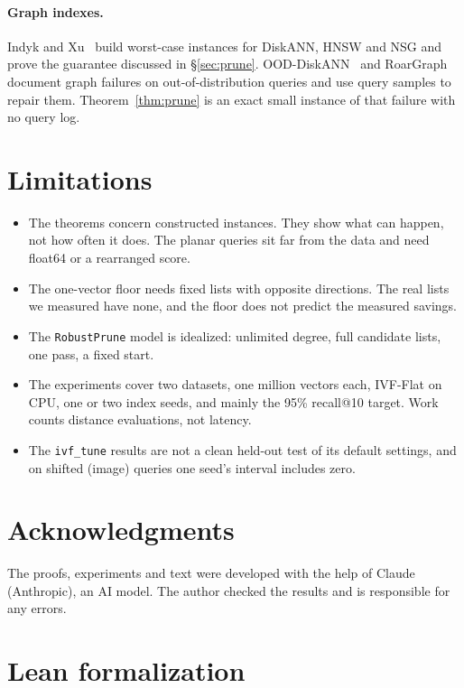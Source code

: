 \documentclass[11pt]{article}
\theoremstyle{definition}
\theoremstyle{remark}
\begin{document}
\paragraph{Graph indexes.} Indyk and Xu~\cite{indyk2023} build worst-case instances for DiskANN, HNSW and NSG and prove the guarantee discussed in \S\ref{sec:prune}. OOD-DiskANN~\cite{jaiswal2022ood} and RoarGraph~\cite{chen2024roargraph} document graph failures on out-of-distribution queries and use query samples to repair them. Theorem~\ref{thm:prune} is an exact small instance of that failure with no query log.

\section{Limitations}\label{sec:limits}

\begin{itemize}
\item The theorems concern constructed instances. They show what can happen, not how often it does. The planar queries sit far from the data and need float64 or a rearranged score.
\item The one-vector floor needs fixed lists with opposite directions. The real lists we measured have none, and the floor does not predict the measured savings.
\item The \texttt{RobustPrune} model is idealized: unlimited degree, full candidate lists, one pass, a fixed start.
\item The experiments cover two datasets, one million vectors each, IVF-Flat on CPU, one or two index seeds, and mainly the 95\% recall@10 target. Work counts distance evaluations, not latency.
\item The \texttt{ivf\_tune} results are not a clean held-out test of its default settings, and on shifted (image) queries one seed's interval includes zero.
\end{itemize}

\section*{Acknowledgments}
The proofs, experiments and text were developed with the help of Claude (Anthropic), an AI model. The author checked the results and is responsible for any errors.




\appendix
\section{Lean formalization}\label{app:lean}
\end{document}
